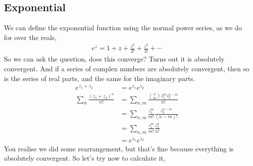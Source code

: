 \documentclass{article}
\begin{document}
\subsection{Exponential}
We can define the exponential function using the normal power series, as we do for over the reals,
\begin{gather*}
	e^z = 1 + z + \frac{z^2}{2!} + \frac{z^3}{3!} + \cdots
\end{gather*}
So we can ask the question, does this converge? Turns out it is absolutely convergent. And if a series
of complex numbers are absolutely convergent, then so is the series of real parts, and the same for the
imaginary parts.
\begin{align*}
	e^{z_1+z_2}                                    & = e^{z_1}e^{z_2}                                                     \\
	\displaystyle\sum_{n}^{}\frac{(z_1+z_2)^n}{n!} & = \displaystyle\sum_{n,m}^{}\frac{\binom{n}{m}z_1^m z_2^{n-m}}{n!}   \\
	                                               & = \displaystyle\sum_{n,m}^{}\frac{z_1^m}{m!}\frac{z_2^{n-m}}{(n-m)!} \\
	                                               & = \displaystyle\sum_{n,m}^{}\frac{z_1^m}{m!}\frac{z_2^n}{n!}         \\
	                                               & = e^{z_1}e^{z_2}
\end{align*}
You realise we did some rearrangement, but that's fine because everything is absolutely
convergent. So let's try now to calculate it,
\end{document}
